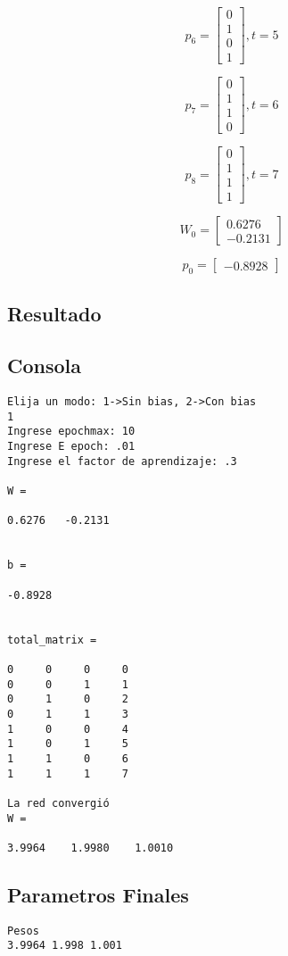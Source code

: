 \documentclass{article}
\begin{document}
\[p_6=
\begin{bmatrix}
0\\
1\\
0\\
1
\end{bmatrix}
,t = 5
\]

\[p_7=
\begin{bmatrix}
0\\
1\\
1\\
0
\end{bmatrix}
,t = 6
\]

\[p_8=
\begin{bmatrix}
0\\
1\\
1\\
1
\end{bmatrix}
,t = 7
\]

\[W_0=
\begin{bmatrix}
0.6276 \\
-0.2131
\end{bmatrix}
\]

\[p_0=
\begin{bmatrix}
-0.8928
\end{bmatrix}
\]
\subsection{Resultado}
\subsection{Consola}
\begin{lstlisting}
Elija un modo: 1->Sin bias, 2->Con bias
1
Ingrese epochmax: 10
Ingrese E epoch: .01
Ingrese el factor de aprendizaje: .3

W =

0.6276   -0.2131


b =

-0.8928


total_matrix =

0     0     0     0
0     0     1     1
0     1     0     2
0     1     1     3
1     0     0     4
1     0     1     5
1     1     0     6
1     1     1     7

La red convergió
W =

3.9964    1.9980    1.0010
\end{lstlisting}
\subsection{Parametros Finales}
\begin{lstlisting}
Pesos
3.9964 1.998 1.001
\end{lstlisting}
\end{document}
